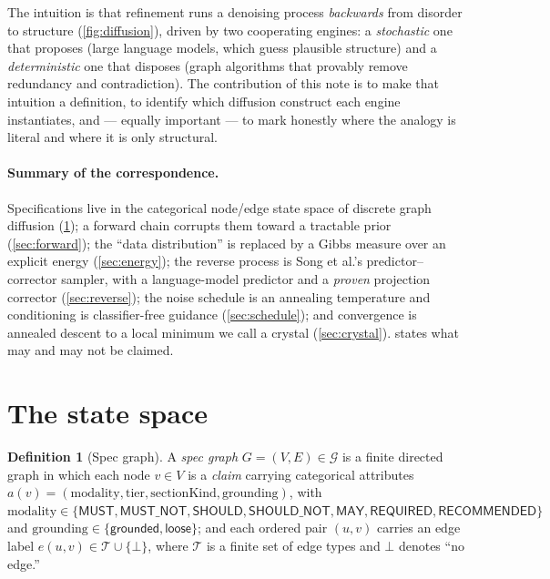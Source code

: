 \documentclass[11pt,letterpaper]{article}
\theoremstyle{plain}
\theoremstyle{definition}
\newtheorem{definition}[theorem]{Definition}
\newcommand{\Graphs}{\mathcal{G}}
\begin{document}


The intuition is that refinement runs a denoising process \emph{backwards} from
disorder to structure (\cref{fig:diffusion}), driven by two cooperating engines:
a \emph{stochastic} one that proposes (large language models, which guess plausible
structure) and a \emph{deterministic} one that disposes (graph algorithms that
provably remove redundancy and contradiction). The contribution of this note is to
make that intuition a definition, to identify which diffusion construct each engine
instantiates, and --- equally important --- to mark honestly where the analogy is
literal and where it is only structural.

\paragraph{Summary of the correspondence.} Specifications live in the categorical
node/edge state space of discrete graph diffusion (\cref{sec:state}); a forward
chain corrupts them toward a tractable prior (\cref{sec:forward}); the ``data
distribution'' is replaced by a Gibbs measure over an explicit energy
(\cref{sec:energy}); the reverse process is Song et al.'s predictor--corrector
sampler, with a language-model predictor and a \emph{proven} projection corrector
(\cref{sec:reverse}); the noise schedule is an annealing temperature and
conditioning is classifier-free guidance (\cref{sec:schedule}); and convergence is
annealed descent to a local minimum we call a crystal (\cref{sec:crystal}).
 states what may and may not be claimed.

\section{The state space}
\label{sec:state}

\begin{definition}[Spec graph]
A \emph{spec graph} $G=(V,E)\in\Graphs$ is a finite directed graph in which each
node $v\in V$ is a \emph{claim} carrying categorical attributes
$a(v)=(\mathrm{modality},\mathrm{tier},\mathrm{sectionKind},\mathrm{grounding})$,
with $\mathrm{modality}\in\{\textsf{MUST},\textsf{MUST\_NOT},\textsf{SHOULD},
\textsf{SHOULD\_NOT},\textsf{MAY},\textsf{REQUIRED},\textsf{RECOMMENDED}\}$ and
$\mathrm{grounding}\in\{\textsf{grounded},\textsf{loose}\}$; and each ordered pair
$(u,v)$ carries an edge label $e(u,v)\in\mathcal{T}\cup\{\bot\}$, where
$\mathcal{T}$ is a finite set of edge types and $\bot$ denotes ``no edge.''
\end{definition}
\end{document}
